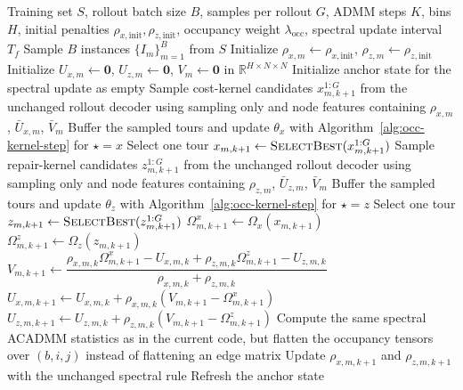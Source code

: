 \begin{algorithm}[t]
\caption{Training with occupancy-space ACADMM}
\label{alg:occ-training}
\begin{algorithmic}[1]
\REQUIRE Training set $S$, rollout batch size $B$, samples per rollout $G$, ADMM steps $K$, bins $H$, initial penalties $\rho_{x,\mathrm{init}},\rho_{z,\mathrm{init}}$, occupancy weight $\lambda_{\mathrm{occ}}$, spectral update interval $T_f$
    \STATE Sample $B$ instances $\{I_m\}_{m=1}^{B}$ from $S$
    \STATE Initialize $\rho_{x,m}\leftarrow\rho_{x,\mathrm{init}}$, $\rho_{z,m}\leftarrow\rho_{z,\mathrm{init}}$
    \STATE Initialize $U_{x,m}\leftarrow\mathbf{0}$, $U_{z,m}\leftarrow\mathbf{0}$, $V_m\leftarrow\mathbf{0}$ in $\mathbb{R}^{H\times N\times N}$
    \STATE Initialize anchor state for the spectral update as empty
        \STATE Sample cost-kernel candidates $x^{1:G}_{m,k+1}$ from the unchanged rollout decoder using sampling only and node features containing $\rho_{x,m}$, $\bar U_{x,m}$, $\bar V_m$
        \STATE Buffer the sampled tours and update $\theta_x$ with Algorithm~\ref{alg:occ-kernel-step} for $\star=x$
        \STATE Select one tour $x_{m,k+1}\leftarrow\textsc{SelectBest}(x^{1:G}_{m,k+1})$
        \STATE Sample repair-kernel candidates $z^{1:G}_{m,k+1}$ from the unchanged rollout decoder using sampling only and node features containing $\rho_{z,m}$, $\bar U_{z,m}$, $\bar V_m$
        \STATE Buffer the sampled tours and update $\theta_z$ with Algorithm~\ref{alg:occ-kernel-step} for $\star=z$
        \STATE Select one tour $z_{m,k+1}\leftarrow\textsc{SelectBest}(z^{1:G}_{m,k+1})$
        \STATE $\Omega^x_{m,k+1}\leftarrow \Omega_x(x_{m,k+1})$
        \STATE $\Omega^z_{m,k+1}\leftarrow \Omega_z(z_{m,k+1})$
        \STATE $V_{m,k+1}\leftarrow \dfrac{\rho_{x,m,k}\Omega^x_{m,k+1}-U_{x,m,k}+\rho_{z,m,k}\Omega^z_{m,k+1}-U_{z,m,k}}{\rho_{x,m,k}+\rho_{z,m,k}}$
        \STATE $U_{x,m,k+1}\leftarrow U_{x,m,k}+\rho_{x,m,k}\left(V_{m,k+1}-\Omega^x_{m,k+1}\right)$
        \STATE $U_{z,m,k+1}\leftarrow U_{z,m,k}+\rho_{z,m,k}\left(V_{m,k+1}-\Omega^z_{m,k+1}\right)$
            \STATE Compute the same spectral ACADMM statistics as in the current code, but flatten the occupancy tensors over $(b,i,j)$ instead of flattening an edge matrix
            \STATE Update $\rho_{x,m,k+1}$ and $\rho_{z,m,k+1}$ with the unchanged spectral rule
            \STATE Refresh the anchor state
        \ENDIF
    \ENDFOR
\ENDFOR
\end{algorithmic}
\end{algorithm}

